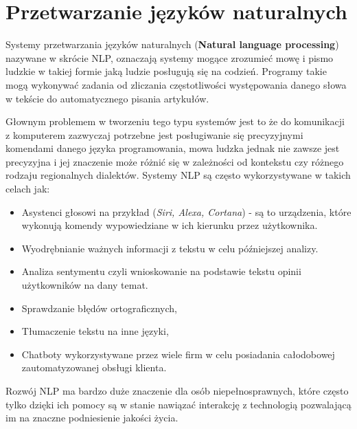 
\chapter{Przetwarzanie języków naturalnych}
Systemy przetwarzania języków naturalnych (\textbf{Natural language processing}) nazywane 
w skrócie NLP, oznaczają systemy mogące zrozumieć mowę i pismo ludzkie w takiej
formie jaką ludzie posługują się na codzień. Programy takie mogą wykonywać zadania od zliczania
częstotliwości występowania danego słowa w tekście do automatycznego pisania artykułów. 

Głownym problemem w tworzeniu tego typu systemów jest to że do komunikacji z komputerem zazwyczaj
potrzebne jest posługiwanie się precyzyjnymi komendami danego języka programowania, mowa ludzka
jednak nie zawsze jest precyzyjna i jej znaczenie może różnić się w zależności od kontekstu czy
różnego rodzaju regionalnych dialektów. Systemy NLP są często wykorzystywane w takich 
celach jak:
\begin{itemize}
    \item Asystenci głosowi na przykład (\textit{Siri, Alexa, Cortana}) - są to urządzenia, które 
    wykonują komendy wypowiedziane w ich kierunku przez użytkownika.  
    \item Wyodrębnianie ważnych informacji z tekstu w celu późniejszej analizy.
    \item Analiza sentymentu czyli wnioskowanie na podstawie tekstu opinii użytkowników na dany temat.
    \item Sprawdzanie błędów ortograficznych,
    \item Tłumaczenie tekstu na inne języki,
    \item Chatboty wykorzystywane przez wiele firm w celu posiadania całodobowej zautomatyzowanej obsługi klienta.
\end{itemize}
Rozwój NLP ma bardzo duże znaczenie dla osób niepełnosprawnych, które często tylko dzięki ich pomocy są 
w stanie nawiązać interakcję z technologią pozwalającą im na znaczne podniesienie jakości życia.
